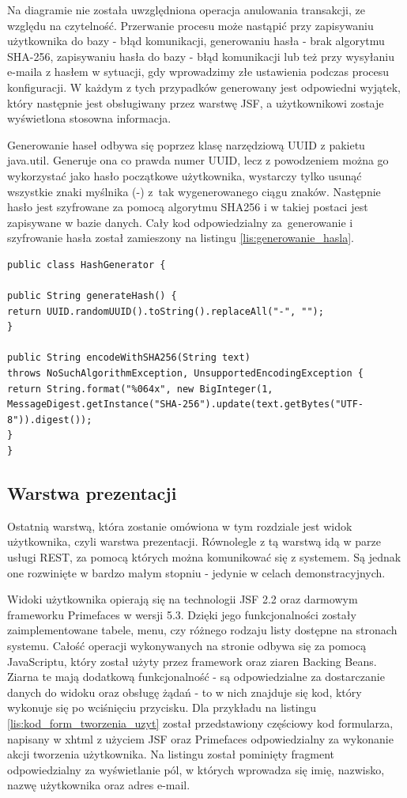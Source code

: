 Na diagramie nie została uwzględniona operacja anulowania transakcji, ze względu na czytelność. Przerwanie procesu może nastąpić przy zapisywaniu użytkownika do bazy - błąd komunikacji, generowaniu hasła - brak algorytmu SHA-256, zapisywaniu hasła do bazy - błąd komunikacji lub też przy wysyłaniu e-maila z hasłem w sytuacji, gdy wprowadzimy złe ustawienia podczas procesu konfiguracji. W każdym z tych przypadków generowany jest odpowiedni wyjątek, który następnie jest obsługiwany przez warstwę JSF, a użytkownikowi zostaje wyświetlona stosowna informacja.

Generowanie haseł odbywa się poprzez klasę narzędziową UUID z pakietu java.util. Generuje ona co prawda numer UUID, lecz z powodzeniem można go wykorzystać jako hasło początkowe użytkownika, wystarczy tylko usunąć wszystkie znaki myślnika (-) z~tak wygenerowanego ciągu znaków. Następnie hasło jest szyfrowane za pomocą algorytmu SHA256 i w takiej postaci jest zapisywane w bazie danych. Cały kod odpowiedzialny za~generowanie i szyfrowanie hasła został zamieszony na listingu \ref{lis:generowanie_hasla}.

\begin{lstlisting}[caption={Klasa generująca i szyfrująca hasła}, label=lis:generowanie_hasla, numbers=none]
public class HashGenerator {

public String generateHash() {
return UUID.randomUUID().toString().replaceAll("-", "");
}

public String encodeWithSHA256(String text) 
throws NoSuchAlgorithmException, UnsupportedEncodingException {
return String.format("%064x", new BigInteger(1, 
MessageDigest.getInstance("SHA-256").update(text.getBytes("UTF-8")).digest());
}
}\end{lstlisting}

\subsection{Warstwa prezentacji}

Ostatnią warstwą, która zostanie omówiona w tym rozdziale jest widok użytkownika, czyli warstwa prezentacji. Równolegle z tą warstwą idą w parze usługi REST, za pomocą których można komunikować się z systemem. Są jednak one rozwinięte w bardzo małym stopniu - jedynie w celach demonstracyjnych.

Widoki użytkownika opierają się na technologii JSF 2.2 oraz darmowym frameworku Primefaces w wersji 5.3. Dzięki jego funkcjonalności zostały zaimplementowane tabele, menu, czy różnego rodzaju listy dostępne na stronach systemu. Całość operacji wykonywanych na stronie odbywa się za pomocą JavaScriptu, który został użyty przez framework oraz ziaren Backing Beans. Ziarna te mają dodatkową funkcjonalność - są odpowiedzialne za dostarczanie danych do widoku oraz obsługę żądań - to w nich znajduje się kod, który wykonuje się po wciśnięciu przycisku. Dla przykładu na listingu \ref{lis:kod_form_tworzenia_uzyt} został przedstawiony częściowy kod formularza, napisany w xhtml z użyciem JSF oraz Primefaces odpowiedzialny za wykonanie akcji tworzenia użytkownika. Na listingu został pominięty fragment odpowiedzialny za wyświetlanie pól, w których wprowadza się imię, nazwisko, nazwę użytkownika oraz adres e-mail.

